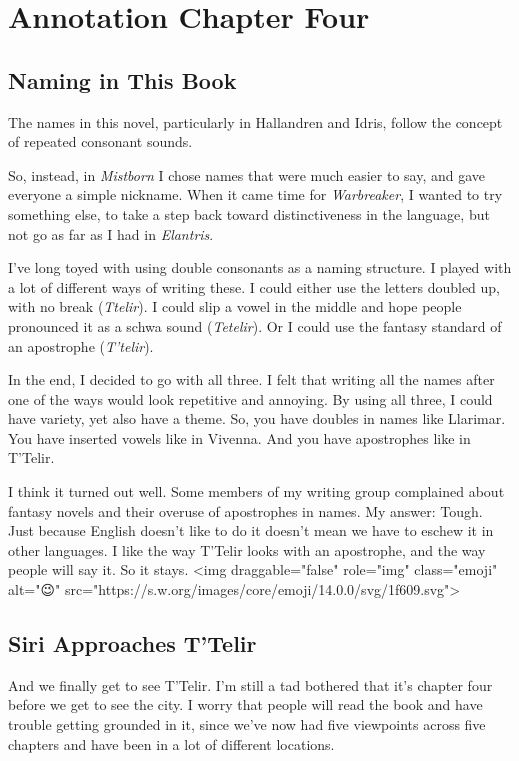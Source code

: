 \section{Annotation Chapter Four}

\subsection*{Naming in This Book}

The names in this novel, particularly in Hallandren and Idris, follow the concept of repeated consonant sounds.



So, instead, in \textit{Mistborn} I chose names that were much easier to say, and gave everyone a simple nickname. When it came time for \textit{Warbreaker}, I wanted to try something else, to take a step back toward distinctiveness in the language, but not go as far as I had in \textit{Elantris}.

I’ve long toyed with using double consonants as a naming structure. I played with a lot of different ways of writing these. I could either use the letters doubled up, with no break (\textit{Ttelir}). I could slip a vowel in the middle and hope people pronounced it as a schwa sound (\textit{Tetelir}). Or I could use the fantasy standard of an apostrophe (\textit{T’telir}).

In the end, I decided to go with all three. I felt that writing all the names after one of the ways would look repetitive and annoying. By using all three, I could have variety, yet also have a theme. So, you have doubles in names like Llarimar. You have inserted vowels like in Vivenna. And you have apostrophes like in T’Telir.

I think it turned out well. Some members of my writing group complained about fantasy novels and their overuse of apostrophes in names. My answer: Tough. Just because English doesn’t like to do it doesn’t mean we have to eschew it in other languages. I like the way T’Telir looks with an apostrophe, and the way people will say it. So it stays. <img draggable="false" role="img" class="emoji" alt="😉" src="https://s.w.org/images/core/emoji/14.0.0/svg/1f609.svg">

\subsection*{Siri Approaches T’Telir}

And we finally get to see T’Telir. I’m still a tad bothered that it’s chapter four before we get to see the city. I worry that people will read the book and have trouble getting grounded in it, since we’ve now had five viewpoints across five chapters and have been in a lot of different locations.

